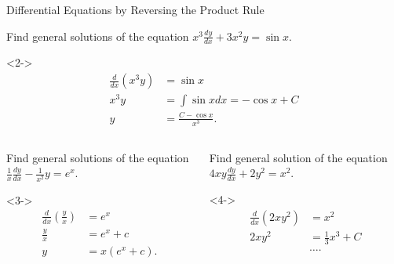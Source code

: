 \documentclass[8pt]{beamer}
\begin{document}
\begin{frame}[shrink]{Differential Equations by Reversing the Product Rule}
	\begin{problem}
		Find general solutions of the equation $x^3 \frac{dy}{dx} + 3x^2 y = \sin x$.
	\end{problem}

	\begin{solution}<2->
		\begin{align*}
			\frac{d}{dx}(x^3y) &= \sin x \\
			x^3y &= \int \sin x dx = -\cos x +C \\
			y &= \frac{C-\cos x}{x^3}
		.\end{align*}
	\end{solution}

\begin{columns}
\begin{column}{.5\linewidth}
\begin{problem}
	Find general solutions of the equation $\frac{1}{x} \frac{dy}{dx}-\frac{1}{x^2}y=e^{x}$.
\end{problem}
\begin{solution}<3->
	\begin{align*}
		\frac{d}{dx}\left( \frac{y}{x} \right) &= e^{x} \\
		\frac{y}{x} &= e^{x}+c \\
		y &= x(e^{x}+c)
	.\end{align*}
\end{solution}
\end{column}
\begin{column}{.5\linewidth}
\begin{problem}
	Find general solution of the equation $4xy \frac{dy}{dx}+2y^2=x^2$.
\end{problem}
\begin{solution}<4->
	\begin{align*}
		\frac{d}{dx}(2xy^2)&= x^2 \\
		2xy^2 &= \frac{1}{3}x^3+C \\
		      &\ldots
	.\end{align*}
\end{solution}
\end{column}
\end{columns}



\end{frame}
\end{document}
